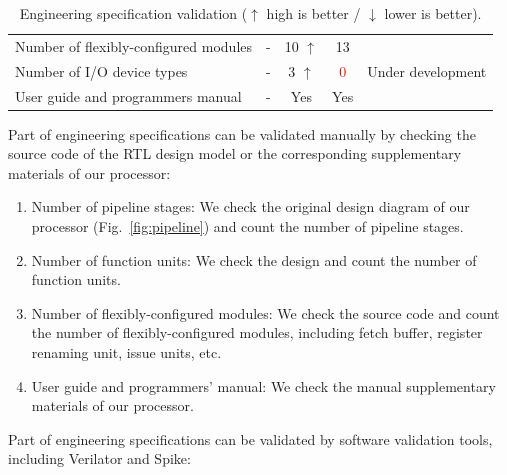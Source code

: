 \begin{table}[!htp]
{\begin{tabular}{lcccc}
        Number of flexibly-configured modules            & -     & 10 $\uparrow$    & 13                        &                   \\
        Number of I/O device types                       & -     & 3 $\uparrow$     & \textcolor{red}{0}        & Under development \\
        User guide and programmers manual                & -     & Yes              & Yes                       &                   \\
    \hline
    \end{tabular}
    }
    \caption{Engineering specification validation ($\uparrow$ high is better / $\downarrow$ lower is better).}
    \label{es-validation}
\end{table}

Part of engineering specifications can be validated manually by checking the source code of the RTL design model or the corresponding supplementary materials of our processor:

\begin{enumerate}
    \item Number of pipeline stages: We check the original design diagram of our processor (Fig.~\ref{fig:pipeline}) and count the number of pipeline stages.
    \item Number of function units: We check the design and count the number of function units.
    \item Number of flexibly-configured modules: We check the source code and count the number of flexibly-configured modules, including fetch buffer, register renaming unit, issue units, etc.
    \item User guide and programmers' manual: We check the manual supplementary materials of our processor.
\end{enumerate}

Part of engineering specifications can be validated by software validation tools, including Verilator and Spike:

